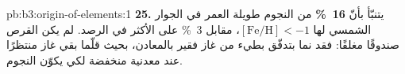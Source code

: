 \begin{solution}{pb:b3:origin-of-elements:1}
\textbf{25.} يتنبّأ  بأنّ
\textbf{\qty[text-series-to-math=true]{16}{\percent}} من النجوم طويلة العمر
في الجوار الشمسي لها $[\mathrm{Fe/H}] < -1$، مقابل
\qty{3}{\percent} على الأكثر في الرصد. لم يكن القرص صندوقًا مغلقًا: فقد
نما بتدفّق بطيء من غاز فقير بالمعادن، بحيث قلّما
بقي غاز منتظرًا عند معدنية منخفضة لكي يكوّن النجوم.
\end{solution}
